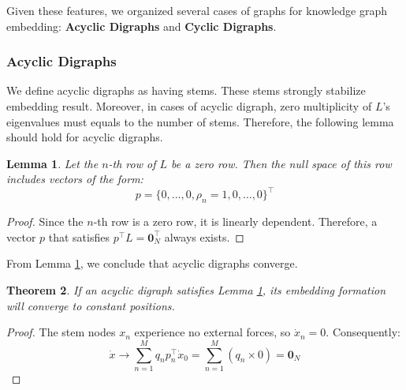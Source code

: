 \documentclass[letterpaper, 10 pt, conference]{ieeeconf}  %
\newtheorem{theorem}{Theorem}[section]
\newtheorem{lemma}[theorem]{Lemma}
\begin{document}
Given these features, we organized several cases of graphs for knowledge graph embedding: \textbf{Acyclic Digraphs} and \textbf{Cyclic Digraphs}.

\subsubsection{Acyclic Digraphs}

We define acyclic digraphs as having stems. These stems strongly stabilize embedding result. Moreover, in cases of acyclic digraph, zero multiplicity of $L$'s eigenvalues must equals to the number of stems. Therefore, the following lemma should hold for acyclic digraphs.

\begin{lemma}\label{lemma:p}
Let the \( n \)-th row of \( L \) be a zero row. Then the null space of this row includes vectors of the form:
\begin{equation}\label{eq:DAG_left}
    p = \{0, \dots, 0, \rho_n = 1, 0, \dots, 0\}^\top
\end{equation}
\end{lemma}

\begin{proof}
Since the \( n \)-th row is a zero row, it is linearly dependent. Therefore, a vector \( p \) that satisfies \( p^\top L = \mathbf{0}_N^\top \) always exists.
\end{proof}

From Lemma \ref{lemma:p}, we conclude that acyclic digraphs converge.

\begin{theorem}\label{th:DAG_converge}
If an acyclic digraph satisfies Lemma \ref{lemma:p}, its embedding formation will converge to constant positions.
\end{theorem}

\begin{proof}
The stem nodes \( x_n \) experience no external forces, so \( \dot{x}_n = 0 \). Consequently:
\begin{equation}\label{eq:0_N}
    \dot{x} \rightarrow \sum_{n=1}^M q_n p_n^\top \dot{x}_0 = \sum_{n=1}^M (q_n \times 0) = \mathbf{0}_N
\end{equation}
\end{proof}
\end{document}
